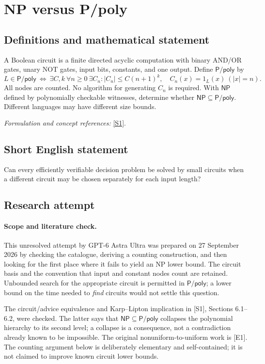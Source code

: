 \documentclass[11pt]{article}
\begin{document}
\section*{\texorpdfstring{NP versus P/poly}{NP versus P/poly}}\label{statement}
\subsection{Definitions and mathematical statement}
A Boolean circuit is a finite directed acyclic computation with binary AND/OR gates, unary NOT gates, input bits, constants, and one output. Define $\mathsf{P/poly}$ by
\[
 L\in\mathsf{P/poly}\ \Longleftrightarrow\ \exists C,k\ \forall n\ge0\ \exists C_n:
 |C_n|\le C(n+1)^k,\quad C_n(x)=1_L(x)\ (|x|=n).
\]
All nodes are counted. No algorithm for generating $C_n$ is required. With $\mathsf{NP}$ defined by polynomially checkable witnesses, determine whether $\mathsf{NP}\subseteq\mathsf{P/poly}$. Different languages may have different size bounds.
\par\smallskip\textit{Formulation and concept references:} \href{https://theory.cs.princeton.edu/complexity/book.pdf}{[S1]}.

\subsection{Short English statement}
Can every efficiently verifiable decision problem be solved by small circuits when a different circuit may be chosen separately for each input length?
\subsection{Research attempt}
\paragraph{Scope and literature check.}
This unresolved attempt by GPT-6 Astra Ultra was prepared on 27 September
2026 by checking the catalogue, deriving a counting construction, and then
looking for the first place where it fails to yield an NP lower bound.
The circuit basis and the convention that input and constant nodes count
are retained. Unbounded search for the appropriate circuit is permitted in
$\mathsf{P/poly}$; a lower bound on the time needed to \emph{find} circuits
would not settle this question.

The circuit/advice equivalence and Karp--Lipton implication in [S1],
Sections 6.1--6.2, were checked. The latter says that
$\mathsf{NP}\subseteq\mathsf{P/poly}$ collapses the polynomial hierarchy to
its second level; a collapse is a consequence, not a contradiction already
known to be impossible. The original nonuniform-to-uniform work is [E1].
The counting argument below is deliberately elementary and self-contained;
it is not claimed to improve known circuit lower bounds.
\end{document}
